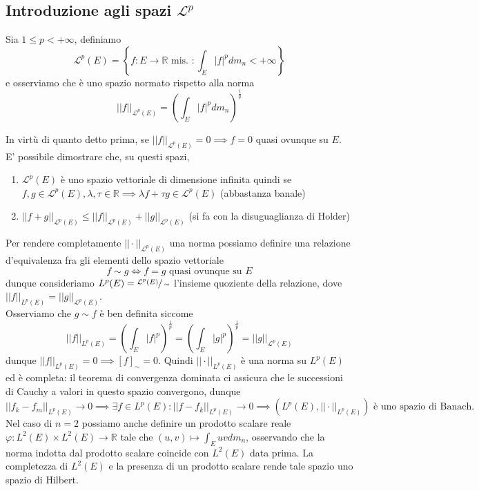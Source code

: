 \subsection{Introduzione agli spazi $\mathcal{L}^p$}
\begin{definition}
	Sia $1 \leq p < +\infty$, definiamo
	$$
	\mathcal{L}^p(E) = \left\{ f: E \to \mathbb{R} \text{ mis. } : \int_E |f|^p dm_n < +\infty \right\}
	$$
	e osserviamo che è uno spazio normato rispetto alla norma
	$$
	|| f ||_{\mathcal{L}^p(E)} = \left( \int_E |f|^p dm_n \right)^{\frac{1}{p}}
	$$
\end{definition}
In virtù di quanto detto prima, se $|| f ||_{\mathcal{L}^p(E)} = 0 \implies f = 0$ quasi ovunque su $E$. E' possibile dimostrare che, su questi spazi,
\begin{enumerate}[label=\protect\circled{\arabic*}]
	\item $\mathcal{L}^p(E)$ è uno spazio vettoriale di dimensione infinita quindi se $f, g \in \mathcal{L}^p(E), \lambda, \tau \in \mathbb{R} \implies \lambda f + \tau g \in \mathcal{L}^p(E)$ (abbastanza banale)
	\item $|| f + g ||_{\mathcal{L}^p(E)} \leq || f ||_{\mathcal{L}^p(E)} + || g ||_{\mathcal{L}^p(E)}$	(si fa con la disuguaglianza di Holder)
\end{enumerate}
Per rendere completamente $|| \cdot ||_{\mathcal{L}^p(E)}$ una norma possiamo definire una relazione d'equivalenza fra gli elementi dello spazio vettoriale
$$
f \sim g \iff f = g \text{ quasi ovunque su } E
$$
dunque consideriamo $L^p(E) = \sfrac{\mathcal{L}^p(E)}{\sim}$ l'insieme quoziente della relazione, dove $|| f ||_{L^p(E)} = || g ||_{\mathcal{L}^p(E)}$. \\
Osserviamo che $g \sim f$ è ben definita siccome
$$
|| f ||_{L^p(E)} = \left(\int_E |f|^p \right)^{\frac{1}{p}} = \left(\int_E |g|^p \right)^{\frac{1}{p}} = || g ||_{\mathcal{L}^p(E)}
$$
dunque $|| f ||_{L^p(E)} = 0 \implies [f]_{\sim} = 0$. Quindi $|| \cdot ||_{L^p(E)}$ è una norma su $L^p(E)$ ed è completa: il teorema di
convergenza dominata ci assicura che le successioni di Cauchy a valori in questo spazio convergono, dunque
$$
|| f_k - f_m ||_{L^p(E)} \to 0 \implies \exists f \in L^p(E) : || f - f_k ||_{L^p(E)} \to 0 \implies (L^p(E), || \cdot ||_{L^p(E)}) \text{ è uno spazio di Banach}.
$$
Nel caso di $n=2$ possiamo anche definire un prodotto scalare reale $\varphi: L^2(E) \times L^2(E) \to \mathbb{R}$ tale che $(u, v) \mapsto \int_E uv dm_n$, osservando che
la norma indotta dal prodotto scalare coincide con $L^2(E)$ data prima. La completezza di $L^2(E)$ e la presenza di un prodotto scalare rende tale spazio uno spazio di Hilbert.

